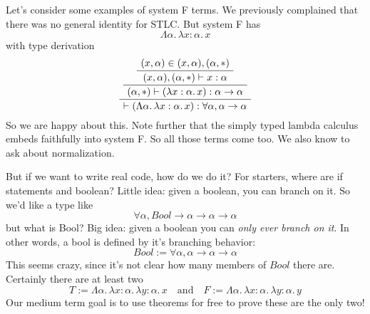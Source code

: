 \documentclass[12pt]{article}
\newenvironment{bprooftree}
  {\leavevmode\hbox\bgroup}
  {\DisplayProof\egroup}
\begin{document}
Let's consider some examples of system F terms.
We previously complained that there was no general identity for STLC.
But system F has 
\[ 
    \Lambda\alpha.\, \lambda x:\alpha.\, x 
\] 
with type derivation
\[
\begin{bprooftree}
\AxiomC{$(x,\alpha) \in (x,\alpha), (\alpha,*)$}
\UnaryInfC{$(x,\alpha), (\alpha,*) \vdash x  : \alpha$}
\UnaryInfC{$(\alpha,*) \vdash (\lambda x:\alpha.\, x)  : \alpha \rightarrow \alpha$}
\UnaryInfC{$\vdash (\Lambda\alpha.\, \lambda x:\alpha.\, x)  : \forall \alpha, \alpha \rightarrow \alpha$}
\end{bprooftree}
\]
So we are happy about this.
Note further that the simply typed lambda calculus embeds faithfully into system F.
So all those terms come too.
We also know to ask about normalization.

But if we want to write real code, how do we do it?
For starters, where are if statements and boolean?
Little idea: given a boolean, you can branch on it.
So we'd like a type like
\[
    \forall \alpha, Bool \rightarrow \alpha \rightarrow \alpha \rightarrow \alpha
\]
but what is Bool?
Big idea: given a boolean you can \textit{only ever branch on it}.
In other words, a bool is defined by it's branching behavior:
\[
Bool :=  \forall \alpha, \alpha \rightarrow \alpha \rightarrow \alpha
\]
This seems crazy, since it's not clear how many members of $Bool$ there are. 
Certainly there are at least two
\[
  T:=\Lambda \alpha.\, \lambda x:\alpha.\,\lambda y:\alpha.\, x\quad \text{and} \quad F:=\Lambda \alpha.\, \lambda x:\alpha.\,\lambda y:\alpha.\, y
\]
Our medium term goal is to use theorems for free to prove these are the only two!
\end{document}
